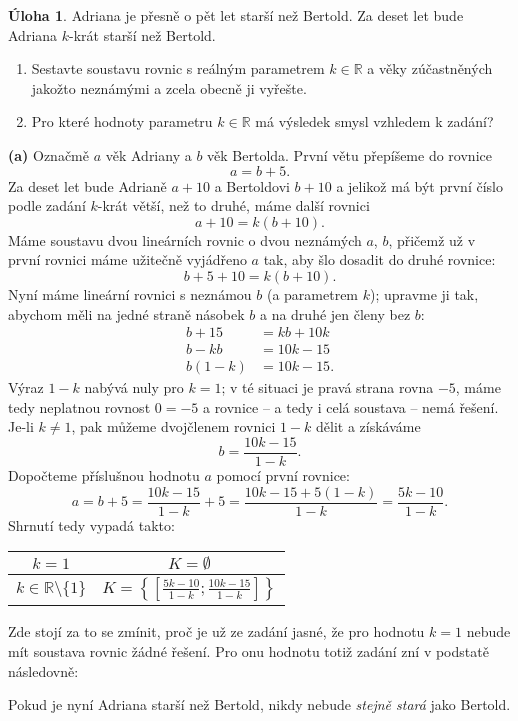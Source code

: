 \documentclass[12pt,a4paper]{article}
\newcommand{\R}{\mathbb{R}}
\theoremstyle{definition}
\newtheorem{uloha}{Úloha}
\newenvironment{res}{\proof}{\endproof}
\begin{document}
\renewcommand*{\proofname}{Řešení}

\begin{uloha}
Adriana je přesně o pět let starší než Bertold. Za deset let bude Adriana $k$-krát starší než Bertold.
\begin{enumerate}
	\item Sestavte soustavu rovnic s reálným parametrem $k \in \R$ a věky zúčastněných jakožto neznámými a zcela obecně ji vyřešte.
	\item Pro které hodnoty parametru $k \in \R$ má výsledek smysl vzhledem k zadání?
\end{enumerate}
\end{uloha}

\begin{res}
\textbf{(a)} Označmě $a$ věk Adriany a $b$ věk Bertolda. První větu přepíšeme do rovnice
\[ a = b + 5. \]
Za deset let bude Adrianě $a+10$ a Bertoldovi $b+10$ a jelikož má být první číslo podle zadání $k$-krát větší, než to druhé, máme další rovnici
\[ a + 10 = k  (b + 10). \]
Máme soustavu dvou lineárních rovnic o dvou neznámých $a$, $b$, přičemž už v první rovnici máme užitečně vyjádřeno $a$ tak, aby šlo dosadit do druhé rovnice:
\[ b + 5 + 10 = k (b + 10). \]
Nyní máme lineární rovnici s neznámou $b$ (a parametrem $k$); upravme ji tak, abychom měli na jedné straně násobek $b$ a na druhé jen členy bez $b$:
\begin{align*}
b + 15 &= kb + 10 k \\
b - kb &= 10 k - 15 \\
b(1-k) &= 10 k - 15.
\end{align*}
Výraz $1-k$ nabývá nuly pro $k = 1$; v té situaci je pravá strana rovna $-5$, máme tedy neplatnou rovnost $0 = -5$ a rovnice -- a tedy i celá soustava -- nemá řešení. Je-li $k \neq 1$, pak můžeme dvojčlenem rovnici $1-k$ dělit a získáváme
\[ b = \frac{10k - 15}{1 - k}. \]
Dopočteme příslušnou hodnotu $a$ pomocí první rovnice:
\[ a = b + 5 = \frac{10k - 15}{1 - k} + 5 = \frac{10k - 15 + 5(1-k)}{1 - k} = \frac{5k - 10}{1 - k}. \]
Shrnutí tedy vypadá takto:
\begin{center}
\begin{tabular}{c|c}
$k = 1$ & $K = \emptyset$ \\ \hline
$k \in \R \setminus \{1\}$ & $K = \left\{ \left[ \frac{5k - 10}{1 - k}; \frac{10k - 15}{1 - k} \right] \right\}$
\end{tabular}
\end{center}

Zde stojí za to se zmínit, proč je už ze zadání jasné, že pro hodnotu $k = 1$ nebude mít soustava rovnic žádné řešení. Pro onu hodnotu totiž zadání zní v podstatě následovně:
\begin{center}
\end{center}
Pokud je nyní Adriana starší než Bertold, nikdy nebude \emph{stejně stará} jako Bertold.


\end{res}
\end{document}
